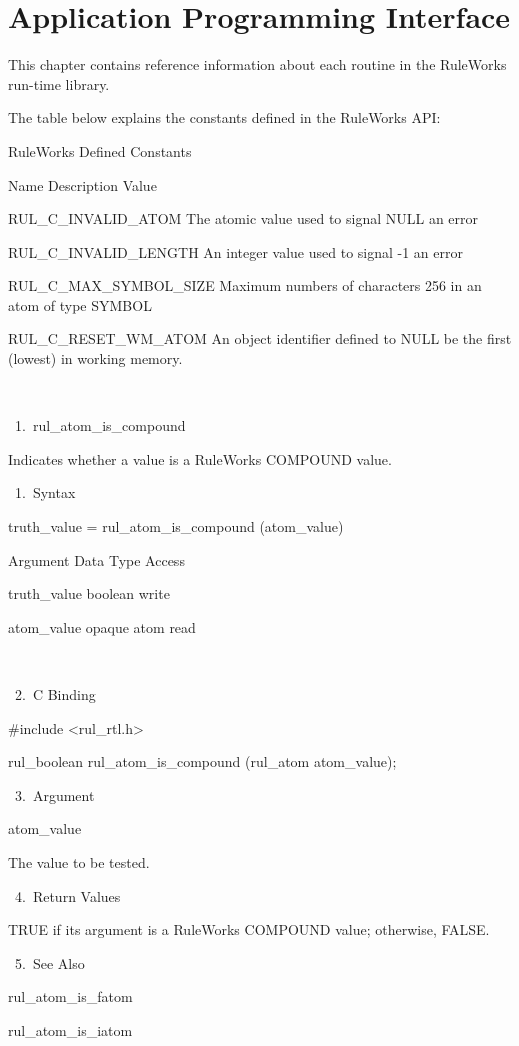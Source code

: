 \chapter{Application Programming Interface}
\label{c:api}

This chapter contains reference information about each routine in the
RuleWorks run-time library.

The table below explains the constants defined in the RuleWorks API:

RuleWorks Defined Constants

Name  Description  Value

RUL_C_INVALID_ATOM  The atomic value used to
signal NULL
 an error

RUL_C_INVALID_LENGTH  An integer value used to
signal -1
 an error

RUL_C_MAX_SYMBOL_SIZE  Maximum numbers of
characters 256
 in an atom of type SYMBOL

RUL_C_RESET_WM_ATOM  An object identifier
defined to  NULL
 be the first (lowest) in working
 memory.

 

 1. rul_atom_is_compound

    Indicates whether a value is a RuleWorks
    COMPOUND value.

       1. Syntax

          truth_value = rul_atom_is_compound
          (atom_value)

          Argument  Data Type    Access

          truth_value  boolean    write

          atom_value  opaque atom   read

           

       2. C Binding

          #include <rul_rtl.h>

          rul_boolean rul_atom_is_compound
          (rul_atom atom_value);

       3. Argument

          atom_value

          The value to be tested.

       4. Return Values

          TRUE if its argument is a RuleWorks
          COMPOUND value; otherwise, FALSE.

       5. See Also

    rul_atom_is_fatom

    rul_atom_is_iatom

